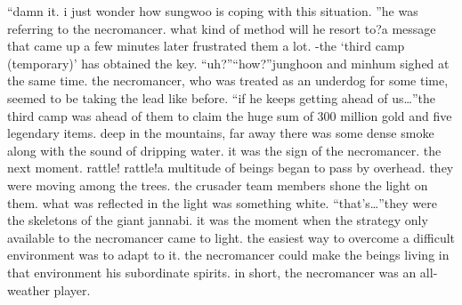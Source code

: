 “damn it.
 i just wonder how sungwoo is coping with this situation.
”he was referring to the necromancer.
 what kind of method will he resort to?a message that came up a few minutes later frustrated them a lot.
-the ‘third camp (temporary)’ has obtained the key.
“uh?”“how?”junghoon and minhum sighed at the same time.
the necromancer, who was treated as an underdog for some time, seemed to be taking the lead like before.
“if he keeps getting ahead of us…”the third camp was ahead of them to claim the huge sum of 300 million gold and five legendary items.
deep in the mountains, far away there was some dense smoke along with the sound of dripping water.
 it was the sign of the necromancer.
the next moment.
rattle! rattle!a multitude of beings began to pass by overhead.
 they were moving among the trees.
the crusader team members shone the light on them.
what was reflected in the light was something white.
“that’s…”they were the skeletons of the giant jannabi.
it was the moment when the strategy only available to the necromancer came to light.
the easiest way to overcome a difficult environment was to adapt to it.
the necromancer could make the beings living in that environment his subordinate spirits.
in short, the necromancer was an all-weather player.


 